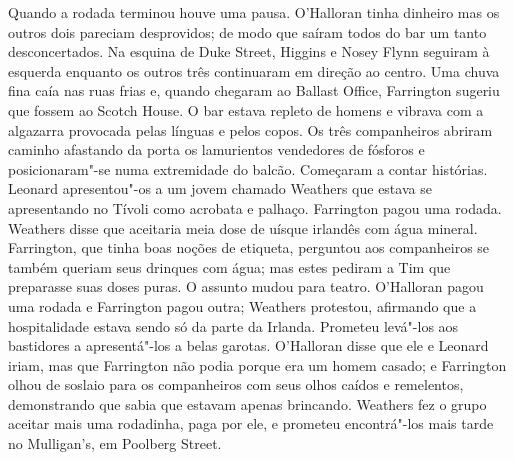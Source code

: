 Quando a rodada terminou houve uma pausa.  O’Halloran tinha dinheiro mas os
outros dois pareciam desprovidos; de modo que saíram todos do bar um tanto
desconcertados.  Na esquina de Duke Street, Higgins e Nosey Flynn seguiram à
esquerda enquanto os outros três continuaram em direção ao centro.  Uma chuva
fina caía nas ruas frias e, quando chegaram ao Ballast Office, Farrington
sugeriu que fossem ao Scotch House.  O bar estava repleto de homens e vibrava
com a algazarra provocada pelas línguas e pelos copos.  Os três companheiros
abriram caminho afastando da porta os lamurientos vendedores de fósforos e
posicionaram"-se numa extremidade do balcão.  Começaram a contar histórias.
Leonard apresentou"-os a um jovem chamado Weathers que estava se apresentando no
Tívoli como acrobata e palhaço.  Farrington pagou uma rodada.  Weathers disse
que aceitaria meia dose de uísque irlandês com água mineral.  Farrington, que
tinha boas noções de etiqueta, perguntou aos companheiros se também queriam
seus drinques com água; mas estes pediram a Tim que preparasse suas doses
puras.  O assunto mudou para teatro.  O’Halloran pagou uma rodada e Farrington
pagou outra; Weathers protestou, afirmando que a hospitalidade estava sendo só
da parte da Irlanda.  Prometeu levá"-los aos bastidores a apresentá"-los a belas
garotas.  O’Halloran disse que ele e Leonard iriam, mas que Farrington não
podia porque era um homem casado; e Farrington olhou de soslaio para os
companheiros com seus olhos caídos e remelentos, demonstrando que sabia que
estavam apenas brincando.  Weathers fez o grupo aceitar mais uma rodadinha,
paga por ele, e prometeu encontrá"-los mais tarde no Mulligan’s, em Poolberg
Street.

